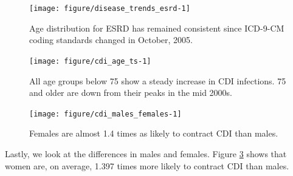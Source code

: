 \documentclass[12pt]{ociamthesis}\usepackage[]{graphicx}\usepackage[]{color}
\newenvironment{knitrout}{}{} %
\begin{document}
\begin{knitrout}
\color{fgcolor}\begin{figure}

{\centering \texttt{[image: figure/disease\_trends\_esrd-1]} 

}

\caption[Age distribution for ESRD has remained consistent since ICD-9-CM coding standards changed in October, 2005]{Age distribution for ESRD has remained consistent since ICD-9-CM coding standards changed in October, 2005.}\label{fig:disease_trends_esrd}
\end{figure}


\end{knitrout}
\label{fig:disease_trends_esrd}




\begin{knitrout}
\color{fgcolor}\begin{figure}

{\centering \texttt{[image: figure/cdi\_age\_ts-1]} 

}

\caption[All age groups below 75 show a steady increase in CDI infections]{All age groups below 75 show a steady increase in CDI infections. 75 and older are down from their peaks in the mid 2000s.}\label{fig:cdi_age_ts}
\end{figure}


\end{knitrout}
\label{fig:cdi_age_ts}

\begin{knitrout}
\color{fgcolor}\begin{figure}

{\centering \texttt{[image: figure/cdi\_males\_females-1]} 

}

\caption[Females are almost 1.4 times as likely to contract CDI than males]{Females are almost 1.4 times as likely to contract CDI than males.}\label{fig:cdi_males_females}
\end{figure}


\end{knitrout}
\label{fig:cdi_males_females}



Lastly, we look at the differences in males and females. Figure \ref{fig:cdi_males_females} shows that women are, on average,
1.397 times more likely to contract CDI than males. 
\end{document}
